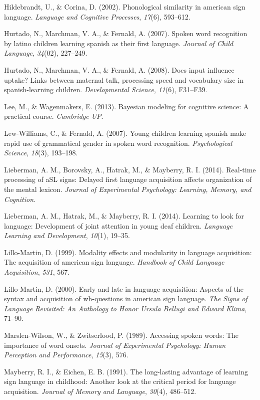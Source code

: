 \documentclass[12pt,]{article}
\begin{document}
Hildebrandt, U., \& Corina, D. (2002). Phonological similarity in
american sign language. \emph{Language and Cognitive Processes},
\emph{17}(6), 593--612.

Hurtado, N., Marchman, V. A., \& Fernald, A. (2007). Spoken word
recognition by latino children learning spanish as their first language.
\emph{Journal of Child Language}, \emph{34}(02), 227--249.

Hurtado, N., Marchman, V. A., \& Fernald, A. (2008). Does input
influence uptake? Links between maternal talk, processing speed and
vocabulary size in spanish-learning children. \emph{Developmental
Science}, \emph{11}(6), F31--F39.

Lee, M., \& Wagenmakers, E. (2013). Bayesian modeling for cognitive
science: A practical course. \emph{Cambridge UP}.

Lew-Williams, C., \& Fernald, A. (2007). Young children learning spanish
make rapid use of grammatical gender in spoken word recognition.
\emph{Psychological Science}, \emph{18}(3), 193--198.

Lieberman, A. M., Borovsky, A., Hatrak, M., \& Mayberry, R. I. (2014).
Real-time processing of aSL signs: Delayed first language acquisition
affects organization of the mental lexicon. \emph{Journal of
Experimental Psychology: Learning, Memory, and Cognition}.

Lieberman, A. M., Hatrak, M., \& Mayberry, R. I. (2014). Learning to
look for language: Development of joint attention in young deaf
children. \emph{Language Learning and Development}, \emph{10}(1),
19--35.

Lillo-Martin, D. (1999). Modality effects and modularity in language
acquisition: The acquisition of american sign language. \emph{Handbook
of Child Language Acquisition}, \emph{531}, 567.

Lillo-Martin, D. (2000). Early and late in language acquisition: Aspects
of the syntax and acquisition of wh-questions in american sign language.
\emph{The Signs of Language Revisited: An Anthology to Honor Ursula
Bellugi and Edward Klima}, 71--90.

Marslen-Wilson, W., \& Zwitserlood, P. (1989). Accessing spoken words:
The importance of word onsets. \emph{Journal of Experimental Psychology:
Human Perception and Performance}, \emph{15}(3), 576.

Mayberry, R. I., \& Eichen, E. B. (1991). The long-lasting advantage of
learning sign language in childhood: Another look at the critical period
for language acquisition. \emph{Journal of Memory and Language},
\emph{30}(4), 486--512.
\end{document}
